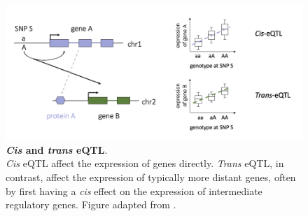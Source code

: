 
\begin{figure}[h]
\centering
\includegraphics[width=15cm]{Chapter1/Fig/eqtl.png}
\caption[\textit{Cis} and \textit{trans} eQTL]{\textbf{\textit{Cis} and \textit{trans} eQTL}.\\
\textit{Cis} eQTL affect the expression of genes directly. 
\textit{Trans} eQTL, in contrast, affect the expression of typically more distant genes, often by first having a \textit{cis} effect on the expression of intermediate regulatory genes.
Figure adapted from \cite{westra2014genome}.
}
\label{fig:eqtl}
\end{figure}

\newpage



